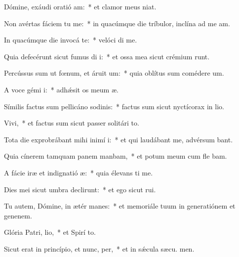 \item Dómine, exáudi oratió am:~* et clamor meus   niat.
\item Non avértas fáciem tu  me:~* in quacúmque die tríbulor, inclína ad me  am.
\item In quacúmque die invocá te:~* velóci di me.
\item Quia defecérunt sicut fumus di i:~* et ossa mea sicut crémium runt.
\item Percússus sum ut fœnum, et áruit  um:~* quia oblítus sum comédere  um.
\item A voce gémi i:~* adhǽsit os meum  æ.
\item Símilis factus sum pellicáno sodinis:~* factus sum sicut nyctícorax in lio.
\item Vivi,~* et factus sum sicut passer solitári  to.
\item Tota die exprobrábant mihi inimí i:~* et qui laudábant me, advérsum  bant.
\item Quia cínerem tamquam panem manbam,~* et potum meum cum fle bam.
\item A fácie iræ et indignatió æ:~* quia élevans ti me.
\item Dies mei sicut umbra declirunt:~* et ego sicut  rui.
\item Tu autem, Dómine, in ætér manes:~* et memoriále tuum in generatiónem et genenem.
\item Glória Patri,  lio,~* et Spirí to.
\item Sicut erat in princípio, et nunc,  per,~* et in sǽcula sæcu. men.
